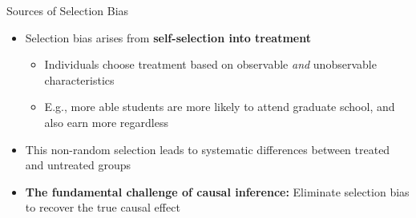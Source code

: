 \documentclass[hyperref={pdfpagelabels=false}]{beamer}
\begin{document}
	\begin{frame}{Sources of Selection Bias}
		\begin{itemize}
			\item Selection bias arises from \textbf{self-selection into treatment}
			\vspace{0.2cm}
			\begin{itemize}
				\item Individuals choose treatment based on observable \emph{and} unobservable characteristics
				\vspace{0.2cm}
				\item E.g., more able students are more likely to attend graduate school, and also earn more regardless
			\end{itemize}
			\vspace{0.2cm}
			\item This non-random selection leads to systematic differences between treated and untreated groups
			\vspace{0.2cm}
			\item \textbf{The fundamental challenge of causal inference:} Eliminate selection bias to recover the true causal effect
		\end{itemize}
	\end{frame}
	
\end{document}

